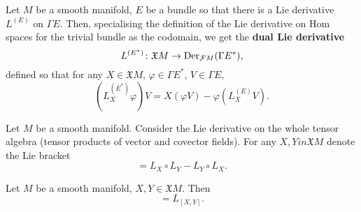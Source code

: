 \begin{definition}
  Let $M$ be a smooth manifold, $E$ be a bundle so that there is a
  Lie derivative $L^{(E)}$ on $\Gamma E$.
  Then, specialising the definition of the Lie derivative on Hom spaces for the
  trivial bundle as the codomain, we get the \textbf{dual Lie derivative}
  \begin{equation}
    L^{(E^*)} \colon \mathfrak{X} M \to {\rm Der}_{\mathcal{F} M}(\Gamma E^*),
  \end{equation}
  defined so that for any
    $X \in \mathfrak{X} M$,
    $\varphi \in \Gamma E^*$,
    $V \in \Gamma E$,
  \begin{equation}
    (L^{(E^*)}_X \varphi) V = X(\varphi V) - \varphi(L^{(E)}_X V).
  \end{equation}
\end{definition}
\begin{definition}
  Let $M$ be a smooth manifold.
  Consider the Lie derivative on the whole tensor algebra
  (tensor products of vector and covector fields).
  For any $X, Y in \mathfrak{X} M$ denote the Lie bracket
  \begin{equation}
    [L_X , L_Y] = L_X \circ L_Y - L_Y \circ L_X.
  \end{equation}
\end{definition}
\begin{proposition}
  Let $M$ be a smooth manifold, $X, Y \in \mathfrak{X} M$.
  Then
  \begin{equation}
    [L_X , L_Y] = L_{[X, Y]}.
  \end{equation}
\end{proposition}
